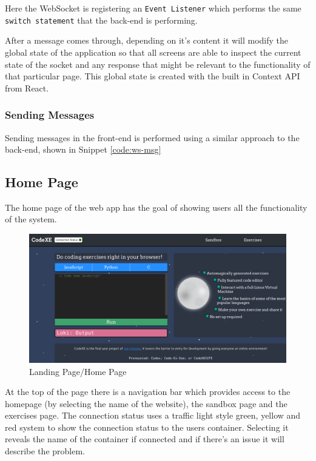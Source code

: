 Here the WebSocket is registering an \texttt{Event Listener} which performs the same \texttt{switch statement} that the back-end is performing.

After a message comes through, depending on it's content it will modify the global state of the application so that all screens are able to inspect the current state of the socket and any response that might be relevant to the functionality of that particular page. This global state is created with the built in Context API from React.

\subsubsection{Sending Messages} \label{impl-ws-fmsgsnd}

Sending messages in the front-end is performed using a similar approach to the back-end, shown in Snippet \ref{code:ws-msg}

\pagebreak

\subsection{Home Page} \label{impl-home-page}

The home page of the web app has the goal of showing users all the functionality of the system.

\begin{figure}[h!]
    \centering
    \includegraphics[width=\linewidth]{res/home_page.png}
    \caption{Landing Page/Home Page}
    \label{fig:homepage}
\end{figure}

At the top of the page there is a navigation bar which provides access to the homepage (by selecting the name of the website), the sandbox page and the exercises page. The connection status uses a traffic light style green, yellow and red system to show the connection status to the users container. Selecting it reveals the name of the container if connected and if there's an issue it will describe the problem.

